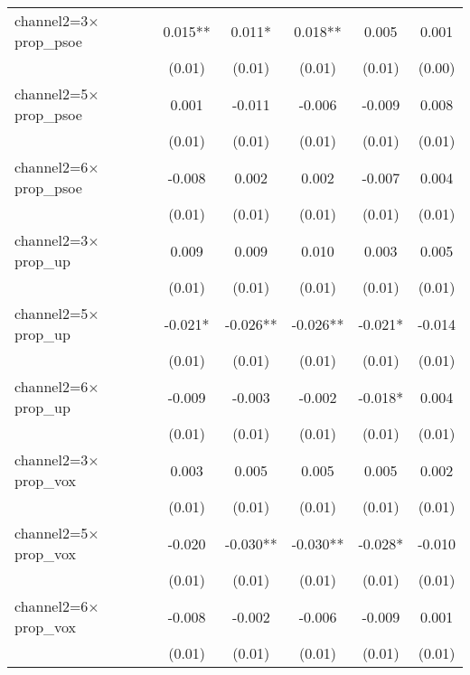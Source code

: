 \begin{tabular}{l*{5}{c}}
channel2=3$\times$prop\_psoe&       0.015** &       0.011*  &       0.018** &       0.005   &       0.001   \\
                    &      (0.01)   &      (0.01)   &      (0.01)   &      (0.01)   &      (0.00)   \\
channel2=5$\times$prop\_psoe&       0.001   &      -0.011   &      -0.006   &      -0.009   &       0.008   \\
                    &      (0.01)   &      (0.01)   &      (0.01)   &      (0.01)   &      (0.01)   \\
channel2=6$\times$prop\_psoe&      -0.008   &       0.002   &       0.002   &      -0.007   &       0.004   \\
                    &      (0.01)   &      (0.01)   &      (0.01)   &      (0.01)   &      (0.01)   \\
channel2=3$\times$prop\_up&       0.009   &       0.009   &       0.010   &       0.003   &       0.005   \\
                    &      (0.01)   &      (0.01)   &      (0.01)   &      (0.01)   &      (0.01)   \\
channel2=5$\times$prop\_up&      -0.021*  &      -0.026** &      -0.026** &      -0.021*  &      -0.014   \\
                    &      (0.01)   &      (0.01)   &      (0.01)   &      (0.01)   &      (0.01)   \\
channel2=6$\times$prop\_up&      -0.009   &      -0.003   &      -0.002   &      -0.018*  &       0.004   \\
                    &      (0.01)   &      (0.01)   &      (0.01)   &      (0.01)   &      (0.01)   \\
channel2=3$\times$prop\_vox&       0.003   &       0.005   &       0.005   &       0.005   &       0.002   \\
                    &      (0.01)   &      (0.01)   &      (0.01)   &      (0.01)   &      (0.01)   \\
channel2=5$\times$prop\_vox&      -0.020   &      -0.030** &      -0.030** &      -0.028*  &      -0.010   \\
                    &      (0.01)   &      (0.01)   &      (0.01)   &      (0.01)   &      (0.01)   \\
channel2=6$\times$prop\_vox&      -0.008   &      -0.002   &      -0.006   &      -0.009   &       0.001   \\
                    &      (0.01)   &      (0.01)   &      (0.01)   &      (0.01)   &      (0.01)   \\

\end{tabular}
